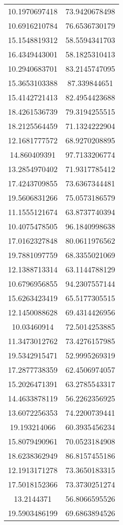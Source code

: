 \begin{table}
\begin{tabular}{cc}
10.1970697418 & 73.9420678498 \\
10.6916210784 & 76.6536730179 \\
15.1548819312 & 58.5594341703 \\
16.4349443001 & 58.1825310413 \\
10.2940683701 & 83.2145747095 \\
15.3653103388 & 87.339844651 \\
15.4142721413 & 82.4954423688 \\
18.4261536739 & 79.3194255515 \\
18.2125564459 & 71.1324222904 \\
12.1681777572 & 68.9270208895 \\
14.860409391 & 97.7133206774 \\
13.2854970402 & 71.9317785412 \\
17.4243709855 & 73.6367344481 \\
19.5606831266 & 75.0573186579 \\
11.1555121674 & 63.8737740394 \\
10.4075478505 & 96.1840998638 \\
17.0162327848 & 80.0611976562 \\
19.7881097759 & 68.3355021069 \\
12.1388713314 & 63.1144788129 \\
10.6796956855 & 94.2307557144 \\
15.6263423419 & 65.5177305515 \\
12.1450088628 & 69.4314426956 \\
10.03460914 & 72.5014253885 \\
11.3473012762 & 73.4276157985 \\
19.5342915471 & 52.9995269319 \\
17.2877738359 & 62.4506974057 \\
15.2026471391 & 63.2785543317 \\
14.4633878119 & 56.2262356925 \\
13.6072256353 & 74.2200739441 \\
19.193214066 & 60.3935456234 \\
15.8079490961 & 70.0523184908 \\
18.6238362949 & 86.8157455186 \\
12.1913171278 & 73.3650183315 \\
17.5018152366 & 73.3730251274 \\
13.2144371 & 56.8066595526 \\
19.5903486199 & 69.6863894526 \\

\end{tabular}
\end{table}
